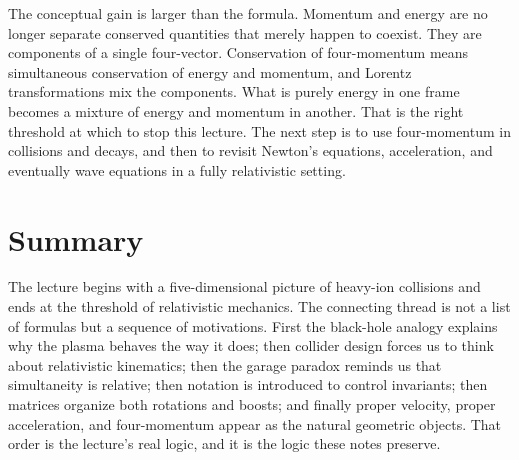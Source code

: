 The conceptual gain is larger than the formula. Momentum and energy are no longer separate conserved quantities that merely happen to coexist. They are components of a single four-vector. Conservation of four-momentum means simultaneous conservation of energy and momentum, and Lorentz transformations mix the components. What is purely energy in one frame becomes a mixture of energy and momentum in another. That is the right threshold at which to stop this lecture. The next step is to use four-momentum in collisions and decays, and then to revisit Newton's equations, acceleration, and eventually wave equations in a fully relativistic setting.

\section{Summary}

The lecture begins with a five-dimensional picture of heavy-ion collisions and ends at the threshold of relativistic mechanics. The connecting thread is not a list of formulas but a sequence of motivations. First the black-hole analogy explains why the plasma behaves the way it does; then collider design forces us to think about relativistic kinematics; then the garage paradox reminds us that simultaneity is relative; then notation is introduced to control invariants; then matrices organize both rotations and boosts; and finally proper velocity, proper acceleration, and four-momentum appear as the natural geometric objects. That order is the lecture's real logic, and it is the logic these notes preserve.